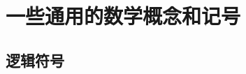 \documentclass[12pt, a4paper, oneside, UTF8]{ctexbook}
\begin{document}
% 
\else
\fi
\chapter{一些通用的数学概念和记号}
\section{逻辑符号}

\ifx\allfiles\undefined
\end{document}
